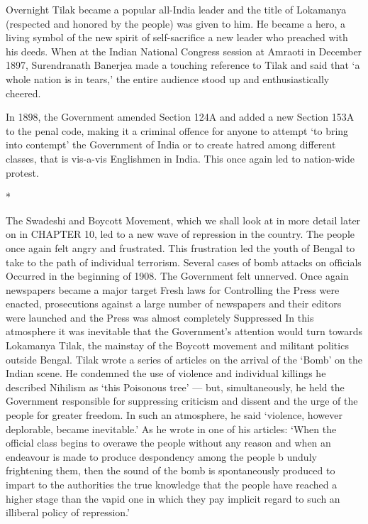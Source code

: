 Overnight Tilak became a popular all-India leader and the title of Lokamanya (respected and honored by the people) was given to him. He became a hero, a living symbol of the new spirit of self-sacrifice a new leader who preached with his deeds. When at the Indian National Congress session at Amraoti in December 1897, Surendranath Banerjea made a touching reference to Tilak and said that ‘a whole nation is in tears,’ the entire audience stood up and enthusiastically cheered.

In 1898, the Government amended Section 124A and added a new Section 153A to the penal code, making it a criminal offence for anyone to attempt ‘to bring into contempt’ the Government of India or to create hatred among different classes, that is vis-a-vis Englishmen in India. This once again led to nation-wide protest.

\begin{center}*\end{center}

The Swadeshi and Boycott Movement, which we shall look at in more detail later on in CHAPTER 10, led to a new wave of repression in the country. The people once again felt angry and frustrated. This frustration led the youth of Bengal to take to the path of individual terrorism. Several cases of bomb attacks on officials Occurred in the beginning of 1908. The Government felt unnerved. Once again newspapers became a major target Fresh laws for Controlling the Press were enacted, prosecutions against a large number of newspapers and their editors were launched and the Press was almost completely Suppressed In this atmosphere it was inevitable that the Government’s attention would turn towards Lokamanya Tilak, the mainstay of the Boycott movement and militant politics outside Bengal. Tilak wrote a series of articles on the arrival of the ‘Bomb’ on the Indian scene. He condemned the use of violence and individual killings he described Nihilism as ‘this Poisonous tree’ — but, simultaneously, he held the Government responsible for suppressing criticism and dissent and the urge of the people for greater freedom. In such an atmosphere, he said ‘violence, however deplorable, became inevitable.’ As he wrote in one of his articles: ‘When the official class begins to overawe the people without any reason and when an endeavour is made to produce despondency among the people b unduly frightening them, then the sound of the bomb is spontaneously produced to impart to the authorities the true knowledge that the people have reached a higher stage than the vapid one in which they pay implicit regard to such an illiberal policy of repression.’

